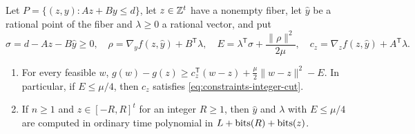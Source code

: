 \begin{lemma}
\label{lem:constraints-residual-cut}
Let $P=\{(z,y):Az+By\le d\}$, let $z\in\mathbb Z^t$ have a nonempty fiber, let
$\hat y$ be a rational point of the fiber and $\lambda\ge0$ a rational vector,
and put
\[
 \sigma=d-Az-B\hat y\ge0,\quad
 \rho=\nabla_yf(z,\hat y)+B^{\mathsf T}\lambda,\quad
 E=\lambda^{\mathsf T}\sigma+\frac{\|\rho\|^2}{2\mu},\quad
 c_z=\nabla_zf(z,\hat y)+A^{\mathsf T}\lambda .
\]
\begin{enumerate}[label=(\alph*)]
\item For every feasible $w$, $g(w)-g(z)\ge c_z^{\mathsf T}(w-z)+\frac\mu2\|w-z\|^2-E$.
In particular, if $E\le\mu/4$, then $c_z$ satisfies
\eqref{eq:constraints-integer-cut}.
\item If $n\ge1$ and $z\in[-R,R]^t$ for an integer $R\ge1$, then
$\hat y$ and $\lambda$ with $E\le\mu/4$ are computed in ordinary time
polynomial in $L+\operatorname{bits}(R)+\operatorname{bits}(z)$.
\end{enumerate}
\end{lemma}

